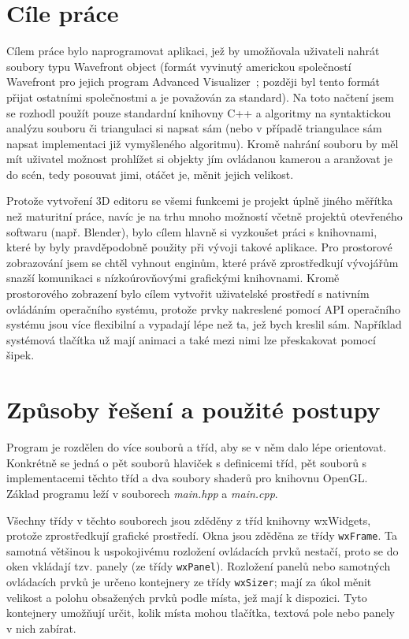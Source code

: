 \documentclass[a4paper, 11pt]{report}
\begin{document}
\chapter{Cíle práce}
Cílem práce bylo naprogramovat aplikaci, jež by umožňovala uživateli nahrát soubory typu Wavefront object (formát vyvinutý americkou společností Wavefront pro jejich program Advanced Visualizer~\cite{wiki:obj}; později byl tento formát přijat ostatními společnostmi a je považován za standard). Na toto načtení jsem se rozhodl použít pouze standardní knihovny C++ a algoritmy na syntaktickou analýzu souboru či triangulaci si napsat sám (nebo v případě triangulace sám napsat implementaci již vymyšleného algoritmu). Kromě nahrání souboru by měl mít uživatel možnost prohlížet si objekty jím ovládanou kamerou a aranžovat je do scén, tedy posouvat jimi, otáčet je, měnit jejich velikost.

Protože vytvoření 3D editoru se všemi funkcemi je projekt úplně jiného měřítka než maturitní práce, navíc je na trhu mnoho možností včetně projektů otevřeného softwaru (např. Blender), bylo cílem hlavně si vyzkoušet práci s knihovnami, které by byly pravděpodobně použity při vývoji takové aplikace. Pro prostorové zobrazování jsem se chtěl vyhnout enginům, které právě zprostředkují vývojářům snazší komunikaci s nízkoúrovňovými grafickými knihovnami. Kromě prostorového zobrazení bylo cílem vytvořit uživatelské prostředí s nativním ovládáním operačního systému, protože prvky nakreslené pomocí API operačního systému jsou více flexibilní a vypadají lépe než ta, jež bych kreslil sám. Například systémová tlačítka už mají animaci a také mezi nimi lze přeskakovat pomocí šipek.

\chapter{Způsoby řešení a použité postupy}
Program je rozdělen do více souborů a tříd, aby se v něm dalo lépe orientovat. Konkrétně se jedná o pět souborů hlaviček s definicemi tříd, pět souborů s implementacemi těchto tříd a dva soubory shaderů pro knihovnu OpenGL. Základ programu leží v souborech \emph{main.hpp} a \emph{main.cpp}.

Všechny třídy v těchto souborech jsou zděděny z tříd knihovny wxWidgets, protože zprostředkují grafické prostředí. Okna jsou zděděna ze třídy \texttt{wxFrame}. Ta samotná většinou k uspokojivému rozložení ovládacích prvků nestačí, proto se do oken vkládají tzv. panely (ze třídy \texttt{wxPanel}). Rozložení panelů nebo samotných ovládacích prvků je určeno kontejnery ze třídy \texttt{wxSizer}; mají za úkol měnit velikost a polohu obsažených prvků podle místa, jež mají k dispozici. Tyto kontejnery umožňují určit, kolik místa mohou tlačítka, textová pole nebo panely v nich zabírat.
\end{document}
